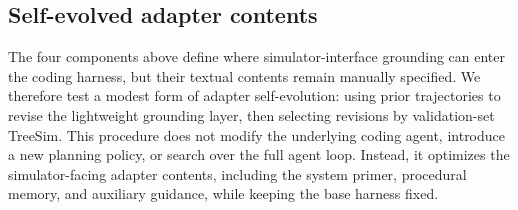 \documentclass{article}
\begin{document}




\subsection{Self-evolved adapter contents}
\label{subsec:self-evolved}

The four components above define where simulator-interface grounding can enter the coding harness, but their textual contents remain manually specified. 
We therefore test a modest form of adapter self-evolution: using prior trajectories to revise the lightweight grounding layer, then selecting revisions by validation-set TreeSim. 
This procedure does not modify the underlying coding agent, introduce a new planning policy, or search over the full agent loop. 
Instead, it optimizes the simulator-facing adapter contents, including the system primer, procedural memory, and auxiliary guidance, while keeping the base harness fixed.
\end{document}
